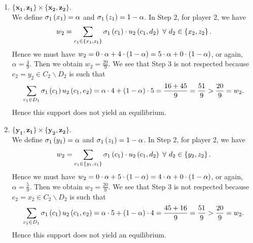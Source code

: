 \begin{enumerate} [label=\Alph*. ]
\begin{enumerate} [label*= (\arabic*)]
    
    \item $\mathbf{\{x_1, z_1\}} \times \mathbf{\{x_2, z_2\}}$. \\
    We define $\sigma_{1} \left(x_1\right) = \alpha$ and $\sigma_{1} \left(z_1\right) = 1 - \alpha$. In Step 2, for player 2, we have
    \begin{equation*}
        w_2 = \sum_{c_1 \in \left\{x_1, z_1\right\}} \sigma_{1} \left(c_1\right) \cdot u_2 \left(c_1, d_2\right) \ \forall \ d_2 \in \left\{x_2, z_2\right\}.
    \end{equation*}
    Hence we must have $w_2 = 0 \cdot \alpha + 4 \cdot \left(1 - \alpha\right) = 5 \cdot \alpha + 0 \cdot \left(1 - \alpha\right)$, or again, $\alpha = \frac{4}{9}$. Then we obtain $w_2 = \frac{20}{9}$. We see that Step 3 is not respected because $e_2 = y_2 \in C_2 \backslash D_2$ is such that 
    \begin{equation*}
        \sum_{c_{1} \in D_{1}} \sigma_{1} \left(c_1\right) u_2 \left(c_{1}, e_2\right)
        = \alpha \cdot 4 + \left(1 - \alpha\right) \cdot 5
        = \dfrac{16 + 45}{9}
        = \dfrac{51}{9}
        > \dfrac{20}{9}
        = w_2.
    \end{equation*}
    Hence this support does not yield an equilibrium.
    
    
    
    \item $\mathbf{\{y_1, z_1\}} \times \mathbf{\{y_2, z_2\}}$. \\
    We define $\sigma_{1} \left(y_1\right) = \alpha$ and $\sigma_{1} \left(z_1\right) = 1 - \alpha$. In Step 2, for player 2, we have
    \begin{equation*}
        w_2 = \sum_{c_1 \in \left\{y_1, z_1\right\}} \sigma_{1} \left(c_1\right) \cdot u_2 \left(c_1, d_2\right) \ \forall \ d_2 \in \left\{y_2, z_2\right\}.
    \end{equation*}
    Hence we must have $w_2 = 0 \cdot \alpha + 5 \cdot \left(1 - \alpha\right) = 4 \cdot \alpha + 0 \cdot \left(1 - \alpha\right)$, or again, $\alpha = \frac{5}{9}$. Then we obtain $w_2 = \frac{20}{9}$. We see that Step 3 is not respected because $e_2 = x_2 \in C_2 \backslash D_2$ is such that 
    \begin{equation*}
        \sum_{c_{1} \in D_{1}} \sigma_{1} \left(c_1\right) u_2 \left(c_{1}, e_2\right)
        = \alpha \cdot 5 + \left(1 - \alpha\right) \cdot 4
        = \dfrac{45 + 16}{9}
        = \dfrac{51}{9}
        > \dfrac{20}{9}
        = w_2.
    \end{equation*}
    Hence this support does not yield an equilibrium.
    
    
    

\end{enumerate}
\end{enumerate}
